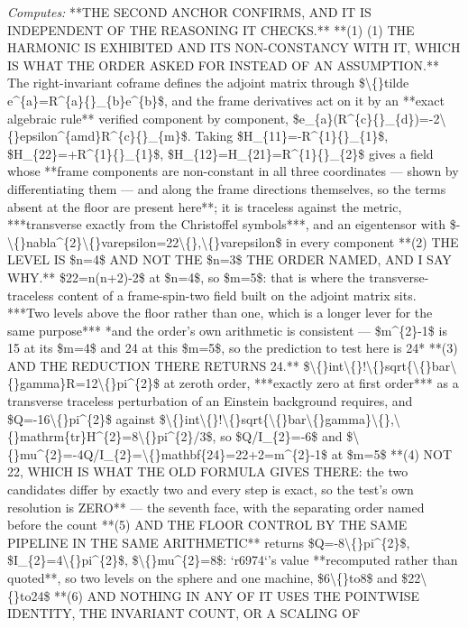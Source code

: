 \begin{description}
\emph{Computes:} **THE SECOND ANCHOR CONFIRMS, AND IT IS INDEPENDENT OF THE REASONING IT CHECKS.**  **(1) (1) THE HARMONIC IS EXHIBITED AND ITS NON-CONSTANCY WITH IT, WHICH IS WHAT THE ORDER ASKED FOR INSTEAD OF AN ASSUMPTION.** The right-invariant coframe defines the adjoint matrix through \$\textbackslash\{\}tilde e\textasciicircum{}\{a\}=R\textasciicircum{}\{a\}\{\}\_\{b\}e\textasciicircum{}\{b\}\$, and the frame derivatives act on it by an **exact algebraic rule** verified component by component, \$e\_\{a\}(R\textasciicircum{}\{c\}\{\}\_\{d\})=-2\textbackslash\{\}epsilon\textasciicircum{}\{amd\}R\textasciicircum{}\{c\}\{\}\_\{m\}\$. Taking \$H\_\{11\}=-R\textasciicircum{}\{1\}\{\}\_\{1\}\$, \$H\_\{22\}=+R\textasciicircum{}\{1\}\{\}\_\{1\}\$, \$H\_\{12\}=H\_\{21\}=R\textasciicircum{}\{1\}\{\}\_\{2\}\$ gives a field whose **frame components are non-constant in all three coordinates --- shown by differentiating them --- and along the frame directions themselves, so the terms absent at the floor are present here**; it is traceless against the metric, ***transverse exactly from the Christoffel symbols***, and an eigentensor with \$-\textbackslash\{\}nabla\textasciicircum{}\{2\}\textbackslash\{\}varepsilon=22\textbackslash\{\},\textbackslash\{\}varepsilon\$ in every component  **(2) THE LEVEL IS \$n=4\$ AND NOT THE \$n=3\$ THE ORDER NAMED, AND I SAY WHY.** \$22=n(n+2)-2\$ at \$n=4\$, so \$m=5\$: that is where the transverse-traceless content of a frame-spin-two field built on the adjoint matrix sits. ***Two levels above the floor rather than one, which is a longer lever for the same purpose***  *and the order's own arithmetic is consistent --- \$m\textasciicircum{}\{2\}-1\$ is 15 at its \$m=4\$ and 24 at this \$m=5\$, so the prediction to test here is 24*  **(3)  AND THE REDUCTION THERE RETURNS 24.** \$\textbackslash\{\}int\textbackslash\{\}!\textbackslash\{\}sqrt\{\textbackslash\{\}bar\textbackslash\{\}gamma\}R=12\textbackslash\{\}pi\textasciicircum{}\{2\}\$ at zeroth order, ***exactly zero at first order*** as a transverse traceless perturbation of an Einstein background requires, and \$Q=-16\textbackslash\{\}pi\textasciicircum{}\{2\}\$ against \$\textbackslash\{\}int\textbackslash\{\}!\textbackslash\{\}sqrt\{\textbackslash\{\}bar\textbackslash\{\}gamma\}\textbackslash\{\},\textbackslash\{\}mathrm\{tr\}H\textasciicircum{}\{2\}=8\textbackslash\{\}pi\textasciicircum{}\{2\}/3\$, so \$Q/I\_\{2\}=-6\$ and \$\textbackslash\{\}mu\textasciicircum{}\{2\}=-4Q/I\_\{2\}=\textbackslash\{\}mathbf\{24\}=22+2=m\textasciicircum{}\{2\}-1\$ at \$m=5\$  **(4) NOT 22, WHICH IS WHAT THE OLD FORMULA GIVES THERE: the two candidates differ by exactly two and every step is exact, so the test's own resolution is ZERO** --- the seventh face, with the separating order named before the count  **(5) AND THE FLOOR CONTROL BY THE SAME PIPELINE IN THE SAME ARITHMETIC** returns \$Q=-8\textbackslash\{\}pi\textasciicircum{}\{2\}\$, \$I\_\{2\}=4\textbackslash\{\}pi\textasciicircum{}\{2\}\$, \$\textbackslash\{\}mu\textasciicircum{}\{2\}=8\$: `r6974`'s value **recomputed rather than quoted**, so two levels on the sphere and one machine, \$6\textbackslash\{\}to8\$ and \$22\textbackslash\{\}to24\$  **(6) AND NOTHING IN ANY OF IT USES THE POINTWISE IDENTITY, THE INVARIANT COUNT, OR A SCALING OF 
\end{description}

